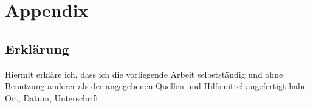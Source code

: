 \documentclass[a4paper, 12pt]{scrreprt} %
\begin{document}
\clearpage
\appendix
\chapter{Appendix}


\clearpage



\newpage
\section*{Erklärung}		
\thispagestyle{empty}				


Hiermit erkläre ich, dass ich die vorliegende Arbeit selbstständig und ohne Benutzung anderer als der angegebenen Quellen und Hilfsmittel angefertigt habe.
\newline\newline
Ort, Datum, Unterschrift
\end{document}
